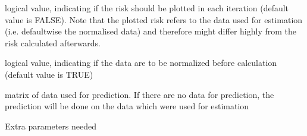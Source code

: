 \documentclass[a4paper]{book}
\begin{document}
\begin{Arguments}
\begin{ldescription}
\item[\code{plotmse}] 
logical value, indicating if the risk should be plotted in each iteration (default value is FALSE). Note that the plotted risk refers to the data used for estimation (i.e. defaultwise the normalised data) and therefore might differ highly from the risk calculated afterwards.

\item[\code{norm}] 
logical value, indicating if the data are to be normalized before calculation (default value is TRUE)

\item[\code{pred}] 
matrix of data used for prediction. If there are no data for prediction, the prediction will be done on the data which were used for estimation


\item[\code{...}] 
Extra parameters needed

\end{ldescription}
\end{Arguments}
%
\end{document}
